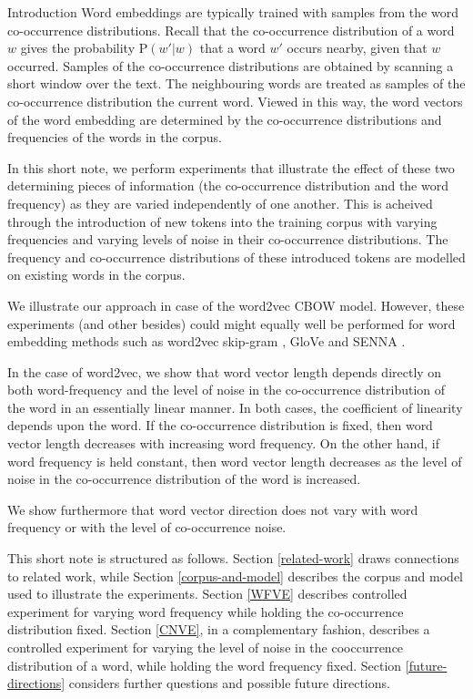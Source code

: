 \documentclass{article} %
\newcommand{\p}{\text{P}}
\begin{document}
\begin{section}{Introduction}
Word embeddings are typically trained with samples from the word co-occurrence distributions.
Recall that the co-occurrence distribution of a word $w$ gives the probability $\p(w'|w)$ that a word $w'$ occurs nearby, given that $w$ occurred.
Samples of the co-occurrence distributions are obtained by scanning a short window over the text.
The neighbouring words are treated as samples of the co-occurrence distribution the current word. 
Viewed in this way, the word vectors of the word embedding are determined by the co-occurrence distributions and frequencies of the words in the corpus.

In this short note, we perform experiments that illustrate the effect of these two determining pieces of information (the co-occurrence distribution and the word frequency) as they are varied independently of one another.
This is acheived through the introduction of new tokens into the training corpus with varying frequencies and varying levels of noise in their co-occurrence distributions.
The frequency and co-occurrence distributions of these introduced tokens are modelled on existing words in the corpus.

We illustrate our approach in case of the word2vec CBOW model.
However, these experiments (and other besides) could might equally well be performed for word embedding methods such as word2vec skip-gram \cite{DistRepns,EfficientEstimation}, GloVe \cite{pennington2014glove} and SENNA \cite{collobert-2011}.

In the case of word2vec, we show that word vector length depends directly on both word-frequency and the level of noise in the co-occurrence distribution of the word in an essentially linear manner.
In both cases, the coefficient of linearity depends upon the word.
If the co-occurrence distribution is fixed, then word vector length decreases with increasing word frequency.
On the other hand, if word frequency is held constant, then word vector length decreases as the level of  noise in the co-occurrence distribution of the word is increased.

We show furthermore that word vector direction does not vary with word frequency or with the level of co-occurrence noise.

This short note is structured as follows.
Section \ref{related-work} draws connections to related work, while Section \ref{corpus-and-model} describes the corpus and model used to illustrate the experiments.
Section \ref{WFVE} describes controlled experiment for varying word frequency while holding the co-occurrence distribution fixed.
Section \ref{CNVE}, in a complementary fashion, describes a controlled experiment for varying the level of noise in the cooccurrence distribution of a word, while holding the word frequency fixed.
Section \ref{future-directions} considers further questions and possible future directions.
\end{section}
\end{document}
